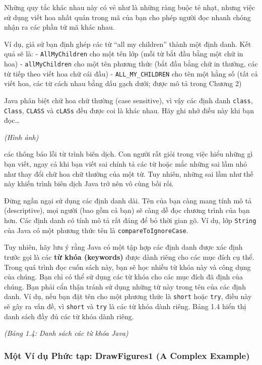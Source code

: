 Những quy tắc khác nhau này có vẻ như là những ràng buộc tẻ nhạt, nhưng
việc sử dụng viết hoa nhất quán trong mã của bạn cho phép người đọc
nhanh chóng nhận ra các phần tử mã khác nhau.

Ví dụ, giả sử bạn định ghép các từ ``all my children'' thành một định
danh. Kết quả sẽ là: - \texttt{AllMyChildren} cho một tên lớp (mỗi từ
bắt đầu bằng một chữ in hoa) - \texttt{allMyChildren} cho một tên phương
thức (bắt đầu bằng chữ in thường, các từ tiếp theo viết hoa chữ cái đầu)
- \texttt{ALL\_MY\_CHILDREN} cho tên một hằng số (tất cả viết hoa, các
từ cách nhau bằng dấu gạch dưới; được mô tả trong Chương 2)

Java phân biệt chữ hoa chữ thường (case sensitive), vì vậy các định danh
\texttt{class}, \texttt{Class}, \texttt{CLASS} và \texttt{cLASs} đều
được coi là khác nhau. Hãy ghi nhớ điều này khi bạn đọc\ldots{}

\emph{(Hình ảnh)}

các thông báo lỗi từ trình biên dịch. Con người rất giỏi trong việc hiểu
những gì bạn viết, ngay cả khi bạn viết sai chính tả các từ hoặc mắc
những sai lầm nhỏ như thay đổi chữ hoa chữ thường của một từ. Tuy nhiên,
những sai lầm như thế này khiến trình biên dịch Java trở nên vô cùng bối
rối.

Đừng ngần ngại sử dụng các định danh dài. Tên của bạn càng mang tính mô
tả (descriptive), mọi người (bao gồm cả bạn) sẽ càng dễ đọc chương trình
của bạn hơn. Các định danh có tính mô tả rất đáng để bỏ thời gian gõ. Ví
dụ, lớp \texttt{String} của Java có một phương thức tên là
\texttt{compareToIgnoreCase}.

Tuy nhiên, hãy lưu ý rằng Java có một tập hợp các định danh được xác
định trước gọi là các \textbf{từ khóa (keywords)} được dành riêng cho
các mục đích cụ thể. Trong quá trình đọc cuốn sách này, bạn sẽ học nhiều
từ khóa này và công dụng của chúng. Bạn chỉ có thể sử dụng các từ khóa
cho các mục đích đã định của chúng. Bạn phải cẩn thận tránh sử dụng
những từ này trong tên của các định danh. Ví dụ, nếu bạn đặt tên cho một
phương thức là \texttt{short} hoặc \texttt{try}, điều này sẽ gây ra vấn
đề, vì \texttt{short} và \texttt{try} là các từ khóa dành riêng. Bảng
1.4 hiển thị danh sách đầy đủ các từ khóa dành riêng.

\emph{(Bảng 1.4: Danh sách các từ khóa Java)}

\subsubsection{Một Ví dụ Phức tạp: DrawFigures1 (A Complex
Example)}\label{mux1ed9t-vuxed-dux1ee5-phux1ee9c-tux1ea1p-drawfigures1-a-complex-example}

